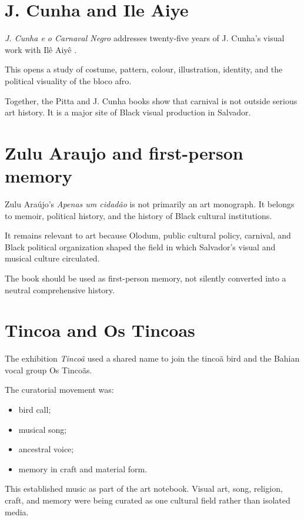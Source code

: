 \section{J. Cunha and Ile Aiye}
\label{section-art-jcunha}

\emph{J. Cunha e o Carnaval Negro}
addresses twenty-five years of J. Cunha's
visual work with Il\^e Aiy\^e
\cite{barata2024jcunha}.

This opens a study of costume, pattern,
colour, illustration, identity, and the
political visuality of the bloco afro.

Together, the Pitta and J. Cunha books show
that carnival is not outside serious art
history.  It is a major site of Black
visual production in Salvador.

\section{Zulu Araujo and first-person memory}
\label{section-art-zulu-araujo}

Zulu Ara\'ujo's
\emph{Apenas um cidad\~ao} is not primarily
an art monograph.  It belongs to memoir,
political history, and the history of Black
cultural institutions.

It remains relevant to art because Olodum,
public cultural policy, carnival, and Black
political organization shaped the field in
which Salvador's visual and musical culture
circulated.

The book should be used as first-person
memory, not silently converted into a
neutral comprehensive history.

\section{Tincoa and Os Tincoas}
\label{section-art-tincoa}

The exhibition \emph{Tinco\~a} used a
shared name to join the tinco\~a bird and
the Bahian vocal group Os Tinco\~as.

The curatorial movement was:

\begin{itemize}
\item bird call;
\item musical song;
\item ancestral voice;
\item memory in craft and material form.
\end{itemize}

This established music as part of the art
notebook.  Visual art, song, religion,
craft, and memory were being curated as
one cultural field rather than isolated
media.

